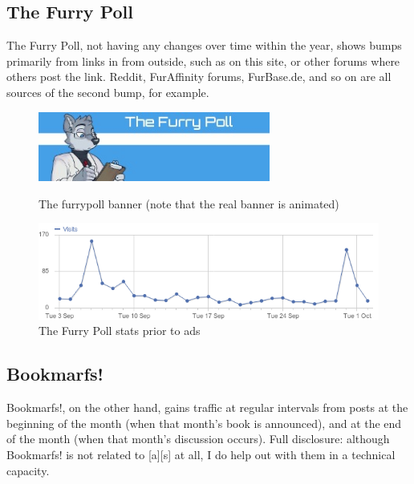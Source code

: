 \subsection*{The Furry Poll}

The Furry Poll, not having any changes over time within the year, shows bumps primarily from links in from outside, such as on this site, or other forums where others post the link. Reddit, FurAffinity forums, FurBase.de, and so on are all sources of the second bump, for example.

\begin{figure}
  \begin{center}
    \includegraphics[width=3in]{content/assets/ads--furrypoll-ad}
  \end{center}
  \caption{The furrypoll banner (note that the real banner is animated)}
  \begin{center}
    \includegraphics[width=\textwidth]{content/assets/ads--furrypoll-preads}
  \end{center}
  \caption{The Furry Poll stats prior to ads}
\end{figure}

\subsection*{Bookmarfs!}

Bookmarfs!, on the other hand, gains traffic at regular intervals from posts at the beginning of the month (when that month's book is announced), and at the end of the month (when that month's discussion occurs). Full disclosure: although Bookmarfs! is not related to [a][s] at all, I do help out with them in a technical capacity.

